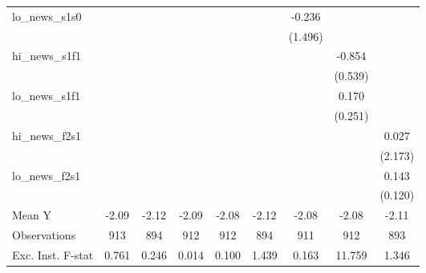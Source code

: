 {\begin{tabular}{l*{8}{c}}
\addlinespace
lo\_news\_s1s0&                     &                     &                     &                     &                     &      -0.236         &                     &                     \\
            &                     &                     &                     &                     &                     &     (1.496)         &                     &                     \\
\addlinespace
hi\_news\_s1f1&                     &                     &                     &                     &                     &                     &      -0.854         &                     \\
            &                     &                     &                     &                     &                     &                     &     (0.539)         &                     \\
\addlinespace
lo\_news\_s1f1&                     &                     &                     &                     &                     &                     &       0.170         &                     \\
            &                     &                     &                     &                     &                     &                     &     (0.251)         &                     \\
\addlinespace
hi\_news\_f2s1&                     &                     &                     &                     &                     &                     &                     &       0.027         \\
            &                     &                     &                     &                     &                     &                     &                     &     (2.173)         \\
\addlinespace
lo\_news\_f2s1&                     &                     &                     &                     &                     &                     &                     &       0.143         \\
            &                     &                     &                     &                     &                     &                     &                     &     (0.120)         \\
\midrule
Mean Y      &       -2.09         &       -2.12         &       -2.09         &       -2.08         &       -2.12         &       -2.08         &       -2.08         &       -2.11         \\
Observations&         913         &         894         &         912         &         912         &         894         &         911         &         912         &         893         \\
Exc. Inst. F-stat&       0.761         &       0.246         &       0.014         &       0.100         &       1.439         &       0.163         &      11.759         &       1.346         \\
\bottomrule
\end{tabular}
}
